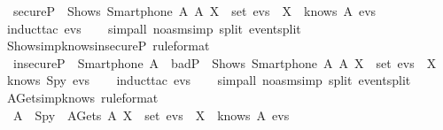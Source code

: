 \begin{isabellebody}
  \ \ {\isachardoublequoteopen}secureP\ {\isasymlongrightarrow}\ Shows\ {\isacharparenleft}Smartphone\ A{\isacharparenright}\ A\ X\ {\isasymin}\ set\ evs\ {\isasymlongrightarrow}\ X\ {\isasymin}\ knows\ A\ evs{\isachardoublequoteclose}\isanewline
  \isadelimproof
  \isanewline
  \ \ %
  \endisadelimproof
  \isatagproof
  \isamarkupfalse%
  \ {\isacharparenleft}induct{\isacharunderscore}tac\ {\isachardoublequoteopen}evs{\isachardoublequoteclose}{\isacharparenright}\isanewline
  \ \ \isamarkupfalse%
  \ {\isacharparenleft}simp{\isacharunderscore}all\ {\isacharparenleft}no{\isacharunderscore}asm{\isacharunderscore}simp{\isacharparenright}\ split{\isacharcolon}\ event{\isachardot}split{\isacharparenright}\isanewline
  \isamarkupfalse%
  \endisatagproof
  {\isafoldproof}%
  \isadelimproof
  \isanewline
  \endisadelimproof
  \isanewline
  \isamarkupfalse%
  \ Shows{\isacharunderscore}imp{\isacharunderscore}knows{\isacharunderscore}insecureP\ {\isacharbrackleft}rule{\isacharunderscore}format{\isacharbrackright}\ {\isacharcolon}\isanewline
  \ \ {\isachardoublequoteopen}{\isacharparenleft}insecureP\ {\isasymand}\ {\isacharparenleft}Smartphone\ A{\isacharparenright}\ {\isasymin}\ badP{\isacharparenright}\ {\isasymlongrightarrow}\ Shows\ {\isacharparenleft}Smartphone\ A{\isacharparenright}\ A\ X\ {\isasymin}\ set\ evs\ {\isasymlongrightarrow}\ X\ {\isasymin}\ knows\ Spy\ evs{\isachardoublequoteclose}\isanewline
  \isadelimproof
  \isanewline
  \ \ %
  \endisadelimproof
  \isatagproof
  \isamarkupfalse%
  \ {\isacharparenleft}induct{\isacharunderscore}tac\ {\isachardoublequoteopen}evs{\isachardoublequoteclose}{\isacharparenright}\isanewline
  \ \ \isamarkupfalse%
  \ {\isacharparenleft}simp{\isacharunderscore}all\ {\isacharparenleft}no{\isacharunderscore}asm{\isacharunderscore}simp{\isacharparenright}\ split{\isacharcolon}\ event{\isachardot}split{\isacharparenright}\isanewline
  \isamarkupfalse%
  \isanewline
  \isanewline
  \endisatagproof
  {\isafoldproof}%
  \isadelimproof
  \isanewline
  \endisadelimproof
  \isamarkupfalse%
  \ AGets{\isacharunderscore}imp{\isacharunderscore}knows\ {\isacharbrackleft}rule{\isacharunderscore}format{\isacharbrackright}\ {\isacharcolon}\isanewline
  \ \ {\isachardoublequoteopen}A\ {\isasymnoteq}\ Spy\ {\isasymlongrightarrow}\ AGets\ A\ X\ {\isasymin}\ set\ evs\ {\isasymlongrightarrow}\ X\ {\isasymin}\ knows\ A\ evs{\isachardoublequoteclose}\isanewline

\end{isabellebody}

